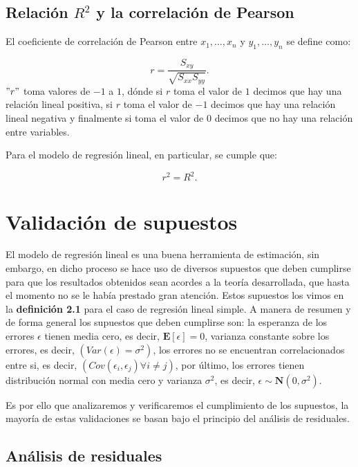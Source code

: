 \documentclass[a4paper,oneside,openany]{book}
\begin{document}
\section{\texorpdfstring{Relación \(R^2\) y la correlación de
Pearson}{Relación R\^{}2 y la correlación de Pearson}}\label{relaciuxf3n-r2-y-la-correlaciuxf3n-de-pearson}

El coeficiente de correlación de Pearson entre \(x_{1},\ldots, x_{n}\) y
\(y_{1},\ldots, y_{n}\) se define como:

\[r=\frac{S_{xy}}{\sqrt{S_{xx}S_{yy}}}.\] \("r"\) toma valores de \(-1\)
a \(1\), dónde si \(r\) toma el valor de \(1\) decimos que hay una
relación lineal positiva, si \(r\) toma el valor de \(-1\) decimos que
hay una relación lineal negativa y finalmente si toma el valor de \(0\)
decimos que no hay una relación entre variables.

Para el modelo de regresión lineal, en particular, se cumple que:

\[r^2=R^2.\]

\chapter{Validación de supuestos}\label{validaciuxf3n-de-supuestos}

El modelo de regresión lineal es una buena herramienta de estimación,
sin embargo, en dicho proceso se hace uso de diversos supuestos que
deben cumplirse para que los resultados obtenidos sean acordes a la
teoría desarrollada, que hasta el momento no se le había prestado gran
atención. Estos supuestos los vimos en la \textbf{definición 2.1} para
el caso de regresión lineal simple. A manera de resumen y de forma
general los supuestos que deben cumplirse son: la esperanza de los
errores \(\epsilon\) tienen media cero, es decir,
\(\mathbf{E}[\epsilon]=0\), varianza constante sobre los errores, es
decir, \((Var(\epsilon)=\sigma^2)\), los errores no se encuentran
correlacionados entre si, es decir,
\((Cov(\epsilon_{i},\epsilon_{j})\forall i\neq j)\), por último, los
errores tienen distribución normal con media cero y varianza
\(\sigma^2\), es decir, \(\epsilon \sim \mathbf{N}(0,\sigma^2).\)

Es por ello que analizaremos y verificaremos el cumplimiento de los
supuestos, la mayoría de estas validaciones se basan bajo el principio
del análisis de residuales.

\section{Análisis de residuales}\label{anuxe1lisis-de-residuales}
\end{document}

